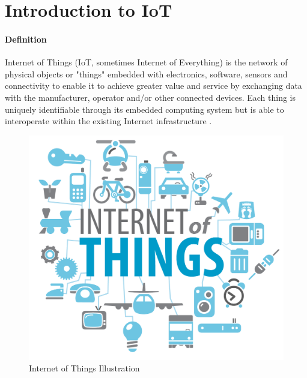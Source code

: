 \documentclass[12pt]{article}
\begin{document}
\maketitle

\section {Introduction to IoT}
\paragraph {Definition} Internet of Things (IoT, sometimes Internet of Everything) is the network of physical objects or "things" embedded with electronics, software, sensors and connectivity to enable it to achieve greater value and service by exchanging data with the manufacturer, operator and/or other connected devices. Each thing is uniquely identifiable through its embedded computing system but is able to interoperate within the existing Internet infrastructure \cite{wiki}.

\begin{figure}
\centering
\caption{Internet of Things Illustration}
\includegraphics[width=\textwidth]{iot.png}
\end{figure}
\end{document}

